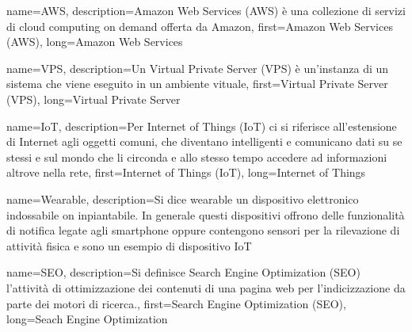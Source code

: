 {
    name={AWS},
    description={Amazon Web Services (AWS) è una collezione di servizi di cloud computing on demand offerta da Amazon},
    first={Amazon Web Services (AWS)},
    long={Amazon Web Services}
} 

{
    name={VPS},
    description={Un Virtual Private Server (VPS) è un'instanza di un sistema che viene eseguito in un ambiente vituale},
    first={Virtual Private Server (VPS)},
    long={Virtual Private Server}
}

{
    name={IoT},
    description={Per Internet of Things (IoT) ci si riferisce all'estensione di Internet agli oggetti comuni, che diventano intelligenti e comunicano dati su se stessi e sul mondo che li circonda e allo stesso tempo accedere ad informazioni altrove nella rete},
    first={Internet of Things (IoT)},
    long={Internet of Things}
}

{
    name={Wearable},
    description={Si dice wearable un dispositivo elettronico indossabile on inpiantabile. In generale questi dispositivi offrono delle funzionalità di notifica legate agli smartphone oppure contengono sensori per la rilevazione di attività fisica e sono un esempio di dispositivo \gls{IoT}}
}

{
    name={SEO},
    description={Si definisce Search Engine Optimization (SEO) l'attività di ottimizzazione dei contenuti di una pagina web per l'indicizzazione da parte dei motori di ricerca.},
    first={Search Engine Optimization (SEO)},
    long={Seach Engine Optimization}
}